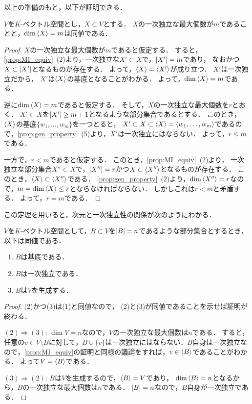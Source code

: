 以上の準備のもと，以下が証明できる．
\begin{thm}
  $V$を$K$-ベクトル空間とし，$X \subset V$とする．
  $X$の一次独立な最大個数が$m$であることと，$\dim \left\langle X \right\rangle = m$は同値である．
\end{thm}
\begin{proof}
  $X$の一次独立な最大個数が$m$であると仮定する．
  すると，\cref{prop:MI_equiv}~(2)より，一次独立な$X' \subset X$で，$\left|X'\right|=m$であり，
  なおかつ$X \subset \left|X'\right|$となるものが存在する．
  よって，$\left\langle X \right\rangle = \left\langle X' \right\rangle$が成り立つ．
  $X'$は一次独立だから，
  $X'$は$\left\langle X \right\rangle$の基底となることがわかる．
  よって，$\dim \left\langle X \right\rangle = m$である．

  逆に$\dim \left\langle X \right\rangle = m$であると仮定する．
  そして，$X$の一次独立な最大個数を$r$とおく．
  $X' \subset X$を$\left|X'\right|\ge m+1$となるような部分集合であるとする．
  このとき，$\left\langle X \right\rangle$の基底$\{w_1,\dots,w_m\}$を一つとると，
  $X' \subset X \subset \left\langle X \right\rangle=\left\langle w_1,\dots,w_m \right\rangle$であるので，\cref{prop:gen_property}~(5)より，$X'$は一次独立にはならない．
  よって，$r \le m$である．

  一方で，$r < m$であると仮定する．
  このとき，\cref{prop:MI_equiv}~(2)より，
  一次独立な部分集合$X'' \subset X$で，$\left|X''\right|=r$かつ$X \subset \left\langle X'' \right\rangle$となるものが存在する．
  このとき，$\left\langle X \right\rangle \subset \left\langle X'' \right\rangle$である．
  \cref{prop:gen_property}~(2)より，$\dim \left\langle X'' \right\rangle = r$なので，$m = \dim \left\langle X \right\rangle \le r$とならなければならない．
  しかしこれは$r < m$と矛盾する．
  よって，$r=m$である．
\end{proof}
この定理を用いると，次元と一次独立性の関係が次のようにわかる．
\begin{thm}
  $V$を$K$-ベクトル空間として，$B \subset V$を$\left|B\right|=n$であるような部分集合とするとき，以下は同値である．
  \begin{enumerate}
    \item $B$は基底である．
    \item $B$は一次独立である．
    \item $B$は$V$を生成する．
  \end{enumerate}
\end{thm}
\begin{proof}
  (2)かつ(3)は(1)と同値なので，
  (2)と(3)が同値であることを示せば証明が終わる．

  $(2) \Rightarrow (3)$: $\dim V = n$なので，$V$の一次独立な最大個数は$n$である．
  すると，任意の$v \in V \setminus B$に対して，$B \cup \{v\}$は一次独立にはならない．$B$自身は一次独立なので，\cref{prop:MI_equiv}の証明と同様の議論をすれば，$v \in \left\langle B \right\rangle$であることがわかる．
  よって$V=\left\langle B \right\rangle$である．

  $(3) \Rightarrow (2)$:
  $B$は$V$を生成するので，$\left\langle B \right\rangle = V$であり，
  $\dim \left\langle B \right\rangle=n$となるから，$B$の一次独立な最大個数は$n$である．
  $\left|B\right|=n$なので，$B$自身が一次独立である．
  \end{proof}
